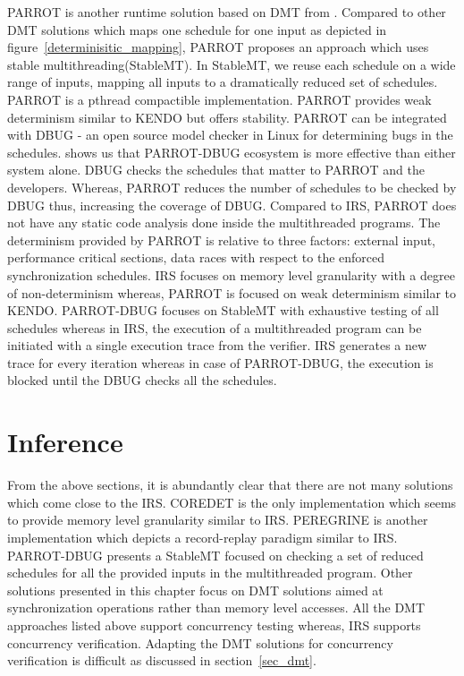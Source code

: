PARROT is another runtime solution based on DMT from \citet{parrot}. 
Compared to other DMT solutions which maps one schedule for one input as depicted in figure~\ref{determinisitic_mapping}, PARROT proposes an approach which uses stable multithreading(StableMT). 
In StableMT, we reuse each schedule on a wide range of inputs, mapping all inputs to a dramatically reduced set of schedules. 
PARROT is a pthread compactible implementation. 
PARROT provides weak determinism similar to KENDO but offers stability. 
PARROT can be integrated with DBUG\citep{dbug} - an open source model checker in Linux for determining bugs in the schedules. 
\citet{parrot} shows us that PARROT-DBUG ecosystem is more effective than either system alone. 
DBUG checks the schedules that matter to PARROT and the developers. 
Whereas, PARROT reduces the number of schedules to be checked by DBUG thus, increasing the coverage of DBUG. 
Compared to IRS, PARROT does not have any static code analysis done inside the multithreaded programs. 
The determinism provided by PARROT is relative to three factors: external input, performance critical sections, data races with respect to the enforced synchronization schedules. 
IRS focuses on memory level granularity with a degree of non-determinism whereas, PARROT is focused on weak determinism similar to KENDO. 
PARROT-DBUG focuses on StableMT with exhaustive testing of all schedules whereas in IRS, the execution of a multithreaded program can be initiated with a single execution trace from the verifier. 
IRS generates a new trace for every iteration whereas in case of PARROT-DBUG, the execution is blocked until the DBUG checks all the schedules.

\section*{Inference}

From the above sections, it is abundantly clear that there are not many solutions which come close to the IRS. 
COREDET is the only implementation which seems to provide memory level granularity similar to IRS. 
PEREGRINE is another implementation which depicts a record-replay paradigm similar to IRS. 
PARROT-DBUG presents a StableMT focused on checking a set of reduced schedules for all the provided inputs in the multithreaded program. 
Other solutions presented in this chapter focus on DMT solutions aimed at synchronization operations rather than memory level accesses. 
All the DMT approaches listed above support concurrency testing whereas, IRS supports concurrency verification. 
Adapting the DMT solutions for concurrency verification is difficult as discussed in section~\ref{sec_dmt}.
